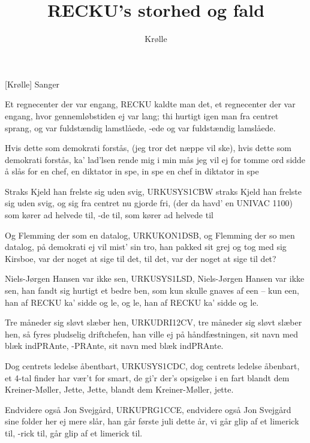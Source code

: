 \documentclass[a4paper,11pt]{article}
\title{RECKU's storhed og fald}
\author{Krølle}
\begin{document}
\maketitle

\begin{roles}
  [Krølle] Sanger
\end{roles}

\begin{song}
  Et regnecenter der var engang,
  RECKU kaldte man det,
  et regnecenter der var engang,
  hvor gennemløbstiden ej var lang;
  thi hurtigt igen man fra centret sprang,
  og var fuldstændig lamstlåede, -ede
  og var fuldstændig lamslåede.

  Hvis dette som demokrati forstås,
  (jeg tror det næppe vil ske),
  hvis dette som demokrati forstås,
  ka' lad'lsen rende mig i min mås
  jeg vil ej for tomme ord sidde å slås
  for en chef, en diktator in spe, in spe
  en chef in diktator in spe

  Straks Kjeld han frelste sig uden svig,
  URKUSYS1CBW
  straks Kjeld han frelste sig uden svig,
  og sig fra centret nu gjorde fri,
  (der da havd' en UNIVAC 1100)
  som kører ad helvede til, -de til,
  som kører ad helvede til

  Og Flemming der som en datalog,
  URKUKON1DSB,
  og Flemming der so men datalog,
  på demokrati ej vil mist' sin tro,
  han pakked sit grej og tog med sig Kirsboe,
  var der noget at sige til det, til det,
  var der noget at sige til det?

  Niels-Jørgen Hansen var ikke sen,
  URKUSYS1LSD,
  Niels-Jørgen Hansen var ikke sen,
  han fandt sig hurtigt et bedre ben,
  som kun skulle gnaves af een -- kun een,
  han af RECKU ka' sidde og le, og le,
  han af RECKU ka' sidde og le.

  Tre måneder sig sløvt slæber hen,
  URKUDRI12CV,
  tre måneder sig sløvt slæber hen,
  så fyres pludselig driftchefen,
  han ville ej på håndfæstningen,
  sit navn med blæk indPRAnte, -PRAnte,
  sit navn med blæk indPRAnte.

  Dog centrets ledelse åbentbart,
  URKUSYS1CDC,
  dog centrets ledelse åbenbart,
  et 4-tal finder har vær't for smart,
  de gi'r der's opsigelse i en fart
  blandt dem Kreiner-Møller, Jette, Jette,
  blandt dem Kreiner-Møller, jette.

  Endvidere også Jon Svejgård,
  URKUPRG1CCE,
  endvidere også Jon Svejgård
  sine folder her ej mere slår,
  han går første juli dette år,
  vi går glip af et limerick til, -rick til,
  går glip af et limerick til.


\end{song}
\end{document}

